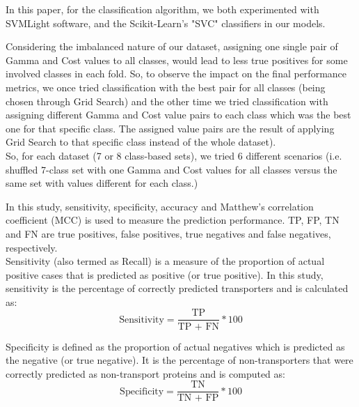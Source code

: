 

        In this paper, for the classification algorithm, we both experimented with SVMLight software, 
        and the Scikit-Learn's "SVC" classifiers in our models. \\


        Considering the imbalanced nature of our dataset, assigning one single pair of Gamma and Cost values to 
        all classes, would lead to less true positives for some involved classes in each fold. So, to observe the 
        impact on the final performance metrics, we once tried classification with 
        the best pair for all classes (being chosen through Grid Search) and the other time we tried classification with 
        assigning different Gamma and Cost value pairs to each class which was the best one for that specific class.
        The assigned value pairs are the result of applying Grid Search to that specific class instead of the whole dataset).\\ 

        So, for each dataset (7 or 8 class-based sets), we tried 6 different 
        scenarios (i.e. shuffled 7-class set with one Gamma and Cost values for all classes versus the same set with values 
        different for each class.)\\

        
        In this study, sensitivity, specificity, accuracy and Matthew's correlation coefficient (MCC) is used to measure the 
        prediction performance. TP, FP, TN and FN are true positives, false positives, 
        true negatives and false negatives, respectively. \\

        Sensitivity (also termed as Recall) is a measure of the proportion of actual positive cases that is 
        predicted as positive (or true positive). In this study, sensitivity is the percentage of correctly predicted transporters 
        and is calculated as:
        \begin{equation}
            \text{Sensitivity} = \frac {\text{TP}}{\text{TP + FN}} * 100
        \end{equation}

        Specificity is defined as the proportion of actual negatives which is predicted as the negative (or true negative). It is  
        the percentage of non-transporters that were correctly predicted as non-transport proteins and is computed as:
        \begin{equation}
            \text{Specificity} = \frac {\text{TN}}{\text{TN + FP}} * 100
        \end{equation}

